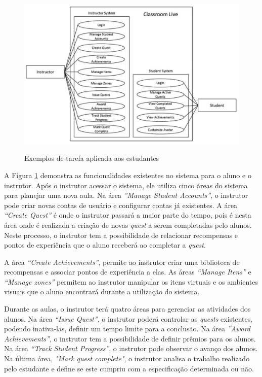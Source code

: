 \documentclass[
	12pt,				%
	oneside,			%
	a4paper,			%
	english,			%
	french,				%
	spanish,			%
	brazil,				%
	]{abntex2}
\begin{document}
\begin{figure}[ht]
\centering
\caption{Exemplos de tarefa aplicada aos estudantes}
\includegraphics[width=1\textwidth]{imagens/classroom_diagrama.png}
\label{fig:classroom_diagrama}
\end{figure}

A Figura \ref{fig:classroom_diagrama} demonstra as funcionalidades existentes no sistema para o aluno e o instrutor. Após o instrutor acessar o sistema, ele utiliza cinco áreas do sistema para planejar uma nova aula. Na área \textit{”Manage Student Accounts”}, o instrutor pode criar novas contas de usuário e configurar contas já existentes. A área \textit{“Create Quest”} é onde o instrutor passará a maior parte do tempo, pois é nesta área onde é realizada a criação de novas \textit{quest} a serem completadas pelo alunos. Neste processo, o instrutor tem a possibilidade de relacionar recompensas e pontos de experiência que o aluno receberá ao completar a \textit{quest}. 

A área \textit{“Create Achievements”}, permite ao instrutor criar uma biblioteca de recompensas e associar pontos de experiência a elas. As áreas \textit{“Manage Itens”} e \textit{“Manage zones”} permitem ao instrutor manipular os itens virtuais e os ambientes visuais que o aluno encontrará durante a utilização do sistema.

Durante as aulas, o instrutor terá quatro áreas para gerenciar as atividades dos alunos. Na área \textit{“Issue Quest”}, o instrutor poderá controlar as \textit{quests} existentes, podendo inativa-las, definir um tempo limite para a conclusão. Na área \textit{”Award Achievements”}, o instrutor tem a possibilidade de definir prêmios para os alunos. Na área \textit{“Track Student Progress”}, o instrutor pode observar o avanço dos alunos. Na última área, \textit{"Mark quest complete"}, o instrutor analisa o trabalho realizado pelo estudante e define se este cumpriu com a especificação determinada ou não.
\end{document}
